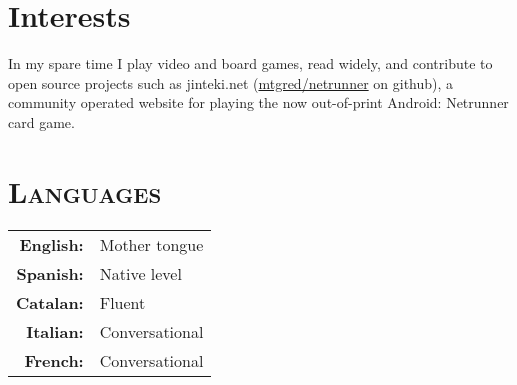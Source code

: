 \documentclass[a4paper,10pt]{article} %
\begin{document}
\section{Interests}
\raggedright
In my spare time I play video and board games, read widely, and contribute to
open source projects such as jinteki.net
(\href{https://github.com/mtgred/netrunner}{mtgred/netrunner} on github), a
community operated website for playing the now out-of-print Android: Netrunner
card game.
%
%
\section{\textsc{Languages}}
\begin{tabular}{rl}
 \textbf{English:} & Mother tongue  \\
 \textbf{Spanish:} & Native level  \\
 \textbf{Catalan:} & Fluent  \\
 \textbf{Italian:} & Conversational  \\
 \textbf{French:}  & Conversational
\end{tabular}
\end{document}

